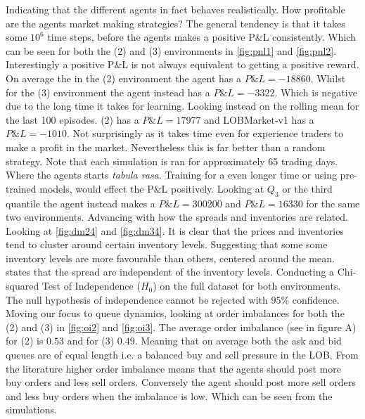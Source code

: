 \documentclass{kththesis}
\theoremstyle{definition}
\begin{document}
\newpage
Indicating that the different agents in fact behaves realistically. How profitable are the agents market making strategies? The general tendency is that it takes some $10^{6}$ time steps, before the agents makes a positive P\&L consistently. Which can be seen for both the (2) and (3) environments in \autoref{fig:pnl1} and \autoref{fig:pnl2}. Interestingly a positive P\&L is not always equivalent to getting a positive reward. On average the in the (2) environment the agent has a $P\&L = -18860$. Whilst for the (3) environment the agent instead has a $P\&L = -3322 $. Which is negative due to the long time it takes for learning. 
\newline
\newline
Looking instead on the rolling mean for the last 100 episodes. (2) has a $P\&L = 17977$ and LOBMarket-v1 has a $P\&L = -1010$.  Not surprisingly as it takes time even for experience traders to make a profit in the market. Nevertheless this is far better than a random strategy. Note that each simulation is ran for approximately 65 trading days. Where the agents starts \textit{tabula rasa}. Training for a even longer time or using pre-trained models, would effect the P\&L positively.  Looking at $Q_3$ or the third quantile the agent instead makes a $P\&L = 300200$ and $P\&L = 16330$ for the same two environments. 
\newline
\newline
Advancing with how the spreads and inventories are related.
Looking at \autoref{fig:dm24} and \autoref{fig:dm34}. It is clear that the prices and inventories tend to cluster around certain inventory levels. Suggesting that some some inventory levels are more favourable than others, centered around the mean. \textcite{ho1981optimal} states that the spread are independent of the inventory levels. Conducting a Chi-squared Test of Independence ($H_0$) on the full dataset for both environments. The null hypothesis of independence cannot be rejected with $95\%$ confidence. 
\newline
\newline
Moving our focus to queue dynamics, looking at order imbalances for both the (2) and (3) in \autoref{fig:oi2} and \autoref{fig:oi3}. The average order imbalance (see in figure A) for (2) is $0.53$ and for (3) $0.49$. Meaning that on average both the ask and bid queues are of equal length i.e. a balanced buy and sell pressure in the LOB. From the literature \parencite{bouchaud2018trades, cartea2015algorithmic} higher order imbalance means that the agents should post more buy orders and less sell orders. Conversely the agent should post more sell orders and less buy orders when the imbalance is low. Which can be seen from the simulations. 
\end{document}
